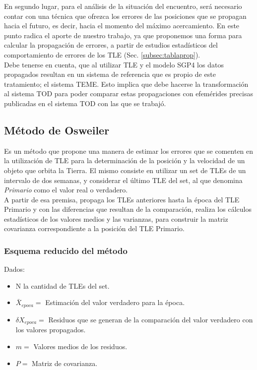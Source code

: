 {En segundo lugar, para el an\'alisis de la situaci\'on del encuentro, ser\'a necesario contar con una t\'ecnica que ofrezca los errores de las posiciones que se propagan hacia el futuro, es decir, hacia el momento del m\'aximo acercamiento. En este punto radica el aporte de nuestro trabajo, ya que proponemos una forma para calcular la propagaci\'on de errores, a partir de estudios estad\'isticos del comportamiento de errores de los TLE (Sec. \ref{subsec:tablaprop}).\\

Debe tenerse en cuenta, que al utilizar TLE y el modelo SGP4  los datos propagados resultan en un sistema de referencia que es propio de este tratamiento; el sistema \ac{TEME}. Esto implica que debe hacerse la transformaci\'on al sistema TOD para poder comparar estas propagaciones con efem\'erides precisas publicadas en el sistema TOD con las que se trabaj\'o.\\

\subsection{M\'etodo de Osweiler}\label{subsec:osw}
Es un m\'etodo que propone una manera de estimar los errores que se comenten en la utilizaci\'on de TLE para la determinaci\'on de la posici\'on y la velocidad de un objeto que orbita la Tierra.
El mismo consiste en utilizar un set de TLEs de un intervalo de dos semanas, y considerar el \'ultimo TLE del set, al que denomina {\it{Primario}} como el valor real o verdadero.\\
A partir de esa premisa, propaga los TLEs anteriores hasta la \'epoca del TLE Primario y con las diferencias que resultan de la comparaci\'on, realiza los c\'alculos estad\'isticos de los valores medios y las varianzas, para construir la matriz covarianza correspondiente a la posici\'on del TLE Primario.\\

\subsubsection*{Esquema reducido del m\'etodo}

Dados:
\begin{itemize}
\itemsep0em
 \item N la cantidad de TLEs del set.
 \item $\bar{X}_{epoca} = $  Estimaci\'on del valor verdadero para la \'epoca.
 \item $\delta X_{epoca} = $ Residuos que se generan de la comparaci\'on del valor verdadero con los valores propagados.
 \item $m = $ Valores medios de los residuos.
 \item $P = $ Matriz de covarianza.
\end{itemize}

}
